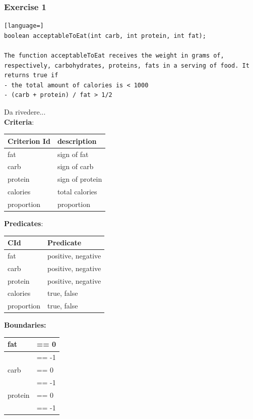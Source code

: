 \documentclass[12pt]{article}
\begin{document}
\subsubsection{Exercise 1}
\begin{lstlisting}[language=]
boolean acceptableToEat(int carb, int protein, int fat);

The function acceptableToEat receives the weight in grams of, respectively, carbohydrates, proteins, fats in a serving of food. It returns true if
- the total amount of calories is < 1000
- (carb + protein) / fat > 1/2
\end{lstlisting}
Da rivedere...\\
\textbf{Criteria}:
\begin{center}
  \begin{tabular}{|l|l|}
    \hline
    Criterion Id & description \\
    \hline
    fat & sign of fat \\
    \hline
    carb & sign of carb \\
    \hline
    protein & sign of protein \\
    \hline
    calories & total calories \\
    \hline
    proportion & proportion \\
    \hline
  \end{tabular}
\end{center}
\textbf{Predicates}:
\begin{center}
  \begin{tabular}{|l|l|}
    \hline
    CId & Predicate \\
    \hline
    fat & positive, negative \\
    \hline
    carb & positive, negative \\
    \hline
    protein & positive, negative \\
    \hline
    calories & true, false \\
    \hline
    proportion & true, false \\
    \hline
  \end{tabular}
\end{center}
\textbf{Boundaries:}
\begin{center}
  \begin{tabular}{|l|l|}
    \hline
    fat & == 0 \\
    \hline
    & == -1 \\
    \hline
    carb & == 0 \\
    \hline
    & == -1 \\
    \hline
    protein & == 0 \\
    \hline
    & == -1 \\
    \hline
  \end{tabular}
\end{center}
\end{document}
